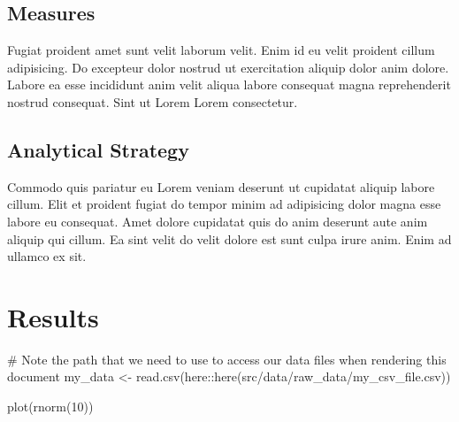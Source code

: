 \documentclass[
  super,
  preprint,
  3p]{elsarticle}
\newenvironment{Shaded}{\begin{snugshade}}{\end{snugshade}}
\newcommand{\CommentTok}[1]{\textcolor[rgb]{0.37,0.37,0.37}{#1}}
\newcommand{\DecValTok}[1]{\textcolor[rgb]{0.68,0.00,0.00}{#1}}
\newcommand{\FunctionTok}[1]{\textcolor[rgb]{0.28,0.35,0.67}{#1}}
\newcommand{\NormalTok}[1]{\textcolor[rgb]{0.00,0.23,0.31}{#1}}
\newcommand{\OtherTok}[1]{\textcolor[rgb]{0.00,0.23,0.31}{#1}}
\newcommand{\SpecialCharTok}[1]{\textcolor[rgb]{0.37,0.37,0.37}{#1}}
\newcommand{\StringTok}[1]{\textcolor[rgb]{0.13,0.47,0.30}{#1}}
\begin{document}
\hypertarget{measures}{%
\subsection{Measures}\label{measures}}

Fugiat proident amet sunt velit laborum velit. Enim id eu velit proident
cillum adipisicing. Do excepteur dolor nostrud ut exercitation aliquip
dolor anim dolore. Labore ea esse incididunt anim velit aliqua labore
consequat magna reprehenderit nostrud consequat. Sint ut Lorem Lorem
consectetur.

\hypertarget{analytical-strategy}{%
\subsection{Analytical Strategy}\label{analytical-strategy}}

Commodo quis pariatur eu Lorem veniam deserunt ut cupidatat aliquip
labore cillum. Elit et proident fugiat do tempor minim ad adipisicing
dolor magna esse labore eu consequat. Amet dolore cupidatat quis do anim
deserunt aute anim aliquip qui cillum. Ea sint velit do velit dolore est
sunt culpa irure anim. Enim ad ullamco ex sit.

\hypertarget{results-1}{%
\section{Results}\label{results-1}}

\begin{Shaded}
\begin{Highlighting}[]
\CommentTok{\# Note the path that we need to use to access our data files when rendering this document}
\NormalTok{my\_data }\OtherTok{\textless{}{-}} \FunctionTok{read.csv}\NormalTok{(here}\SpecialCharTok{::}\FunctionTok{here}\NormalTok{(}\StringTok{\textquotesingle{}src/data/raw\_data/my\_csv\_file.csv\textquotesingle{}}\NormalTok{))}
\end{Highlighting}
\end{Shaded}

\begin{Shaded}
\begin{Highlighting}[]
\FunctionTok{plot}\NormalTok{(}\FunctionTok{rnorm}\NormalTok{(}\DecValTok{10}\NormalTok{))}
\end{Highlighting}
\end{Shaded}
\end{document}
